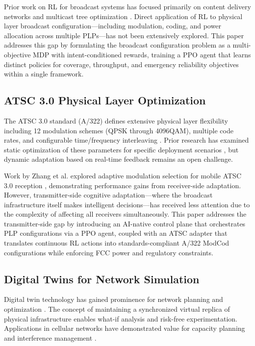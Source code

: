 \documentclass[conference]{IEEEtran}
\begin{document}
Prior work on RL for broadcast systems has focused primarily on content delivery networks and multicast tree optimization \cite{b10}. Direct application of RL to physical layer broadcast configuration—including modulation, coding, and power allocation across multiple PLPs—has not been extensively explored. This paper addresses this gap by formulating the broadcast configuration problem as a multi-objective MDP with intent-conditioned rewards, training a PPO agent that learns distinct policies for coverage, throughput, and emergency reliability objectives within a single framework.

\subsection{ATSC 3.0 Physical Layer Optimization}

The ATSC 3.0 standard (A/322) defines extensive physical layer flexibility including 12 modulation schemes (QPSK through 4096QAM), multiple code rates, and configurable time/frequency interleaving \cite{b1}. Prior research has examined static optimization of these parameters for specific deployment scenarios \cite{b11}, but dynamic adaptation based on real-time feedback remains an open challenge.

Work by Zhang et al. explored adaptive modulation selection for mobile ATSC 3.0 reception \cite{b12}, demonstrating performance gains from receiver-side adaptation. However, transmitter-side cognitive adaptation—where the broadcast infrastructure itself makes intelligent decisions—has received less attention due to the complexity of affecting all receivers simultaneously. This paper addresses the transmitter-side gap by introducing an AI-native control plane that orchestrates PLP configurations via a PPO agent, coupled with an ATSC adapter that translates continuous RL actions into standards-compliant A/322 ModCod configurations while enforcing FCC power and regulatory constraints.

\subsection{Digital Twins for Network Simulation}

Digital twin technology has gained prominence for network planning and optimization \cite{b13}. The concept of maintaining a synchronized virtual replica of physical infrastructure enables what-if analysis and risk-free experimentation. Applications in cellular networks have demonstrated value for capacity planning and interference management \cite{b14}.
\end{document}
